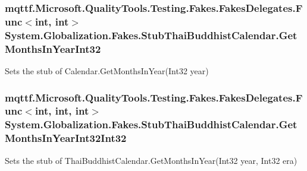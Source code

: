 \hypertarget{class_system_1_1_globalization_1_1_fakes_1_1_stub_thai_buddhist_calendar_a63b72fa94ac038faff893867e3755c38}{
\subsubsection[{Get\-Months\-In\-Year\-Int32}]{\setlength{\rightskip}{0pt plus 5cm}mqttf.\-Microsoft.\-Quality\-Tools.\-Testing.\-Fakes.\-Fakes\-Delegates.\-Func$<$int, int$>$ System.\-Globalization.\-Fakes.\-Stub\-Thai\-Buddhist\-Calendar.\-Get\-Months\-In\-Year\-Int32}}\label{class_system_1_1_globalization_1_1_fakes_1_1_stub_thai_buddhist_calendar_a63b72fa94ac038faff893867e3755c38}


Sets the stub of Calendar.\-Get\-Months\-In\-Year(\-Int32 year)

\hypertarget{class_system_1_1_globalization_1_1_fakes_1_1_stub_thai_buddhist_calendar_ab130494586ca45951aeb85cc04f0a4a4}{
\subsubsection[{Get\-Months\-In\-Year\-Int32\-Int32}]{\setlength{\rightskip}{0pt plus 5cm}mqttf.\-Microsoft.\-Quality\-Tools.\-Testing.\-Fakes.\-Fakes\-Delegates.\-Func$<$int, int, int$>$ System.\-Globalization.\-Fakes.\-Stub\-Thai\-Buddhist\-Calendar.\-Get\-Months\-In\-Year\-Int32\-Int32}}\label{class_system_1_1_globalization_1_1_fakes_1_1_stub_thai_buddhist_calendar_ab130494586ca45951aeb85cc04f0a4a4}


Sets the stub of Thai\-Buddhist\-Calendar.\-Get\-Months\-In\-Year(\-Int32 year, Int32 era)

